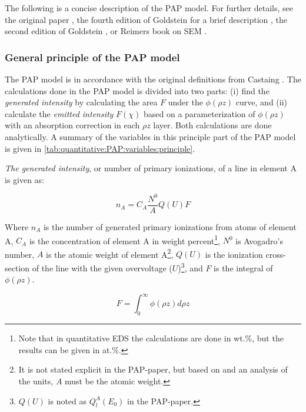 The following is a concise description of the PAP model.
For further details, see the original paper \cite{pap_1991}, the fourth edition of Goldstein for a brief description \cite{goldstein_scanning_2018}, the second edition of Goldstein \cite{goldstein_2ed_1992}, or Reimers book on SEM \cite{reimer_sem}.







\subsubsection{General principle of the PAP model}
\label{theory:quantitative:pap:general_principle}

The PAP model is in accordance with the original definitions from Castaing \cite{castaing_1951}.
The calculations done in the PAP model is divided into two parts: (i) find the \emph{generated intensity} by calculating the area $F$ under the $\phi(\rho z)$ curve, and (ii) calculate the \emph{emitted intensity} $F(\chi)$ based on a parameterization of $\phi(\rho z)$ with an absorption correction in each $\rho z$ layer.
Both calculations are done analytically.
A summary of the variables in this principle part of the PAP model is given in \cref{tab:quantitative:PAP:variables:principle}.


\emph{The generated intensity}, or number of primary ionizations, of a line in element A is given as: 

\begin{equation}
    \label{eq:theory:quantitative:pap:general_principle:n_a}
    n_A = C_A \frac{N^0}{A} Q(U) F
\end{equation}

Where $n_A$ is the number of generated primary ionizations from atoms of element A, $C_A$ is the concentration of element A in weight percent\footnote{Note that in quantitative EDS the calculations are done in wt.\%, but the results can be given in at.\%.}, $N^0$ is Avogadro's number, $A$ is the atomic weight of element A\footnote{It is not stated explicit in the PAP-paper, but based on \cite{love_scott_1990} and an analysis of the units, $A$ must be the atomic weight.}, $Q(U)$ is the ionization cross-section of the line with the given overvoltage ($U$)\footnote{$Q(U)$ is noted as $Q_l^A(E_0)$ in the PAP-paper.}, and $F$ is the integral of $\phi(\rho z)$.

\begin{equation}
    \label{eq:theory:quantitative:pap:general_principle:F}
    F = \int_0^\infty \phi(\rho z) d\rho z
\end{equation}


